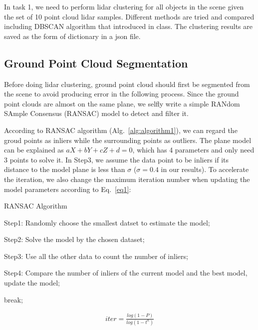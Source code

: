 \documentclass[8pt]{article}
\theoremstyle{nonumberplain}
\begin{document}
In task 1, we need to perform lidar clustering for all objects in the scene given the set of 10 point cloud lidar samples. Different methods are tried and compared including DBSCAN algorithm that introduced in class. The clustering results are saved as the form of dictionary in a json file.

\subsection{Ground Point Cloud Segmentation}

\hspace{1.0em}
Before doing lidar clustering, ground point cloud should first be segmented from the scene to avoid producing error in the following process. Since the ground point clouds are almost on the same plane, we selfly write a simple RANdom SAmple Consensus (RANSAC) model to detect and filter it. 

According to RANSAC algorithm (Alg.~\ref{alg:algorithm1}), we can regard the groud points as inliers while the surrounding points as outliers. The plane model can be explained as $aX+bY+cZ+d=0$, which has 4 parameters and only need 3 points to solve it. In Step3, we assume the data point to be inliers if its distance to the model plane is less than $\sigma$ ($\sigma=0.4$ in our results). To accelerate the iteration, we also change the maximum iteration number when updating the model parameters according to Eq.~\ref{eq1}:

\begin{algorithm}
	\caption{RANSAC Algorithm}
	\begin{algorithmic}  
		
			\STATE Step1: Randomly choose the smallest datset to estimate the model;
			
			\STATE Step2: Solve the model by the chosen dataset;
			
			\STATE Step3: Use all the other data to count the number of inliers;
			
			\STATE Step4: Compare the number of inliers of the current model and the best model, update the model;
			
				\STATE break;
			\ENDIF 
		
		\ENDWHILE
		
	\end{algorithmic}
 \label{alg:algorithm1} 
\end{algorithm}

\begin{equation}
\begin{aligned}
	iter = \frac{log(1-P)}{log(1-t^{n})}
	\label{eq1}
\end{aligned}
\end{equation}
\end{document}
